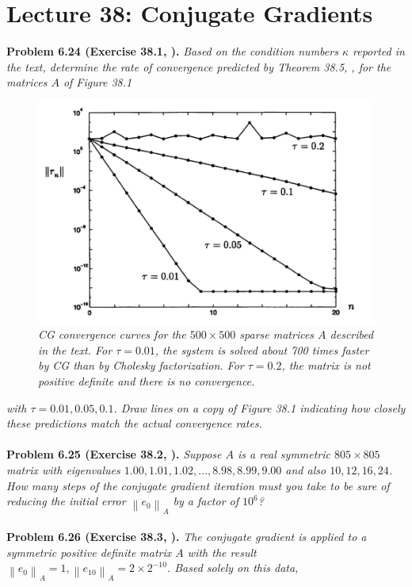 \documentclass[a4paper,oneside]{book}
\numberwithin{equation}{chapter}
\begin{document}
\section{Lecture 38: Conjugate Gradients}
\textbf{Problem 6.24 (Exercise 38.1, \cite{1}).} \textit{Based on the condition numbers $\kappa$ reported in the text, determine the rate of convergence predicted by Theorem 38.5, \cite{1}, for the matrices $A$ of Figure 38.1}
\begin{figure}[H]
	\centering
	\includegraphics[scale=0.35]{14}
	\caption{\textit{CG convergence curves for the $500\times 500$ sparse matrices $A$ described in the text. For $\tau =0.01$, the system is solved about 700 times faster by CG than by Cholesky factorization. For $\tau = 0.2$, the matrix is not positive definite and there is no convergence.}}
\end{figure}
\textit{with $\tau =0.01,0.05,0.1$. Draw lines on a copy of Figure 38.1 indicating how closely these predictions match the actual convergence rates.}\\
\\
\textbf{Problem 6.25 (Exercise 38.2, \cite{1}).} \textit{Suppose $A$ is a real symmetric $805\times 805$ matrix with eigenvalues $1.00,1.01,1.02,\ldots,8.98,8.99,9.00$ and also $10,12,16,24$. How many steps of the conjugate gradient iteration must you take to be sure of reducing the initial error $\left\|e_0\right\|_A$ by a factor of $10^6$?}\\
\\
\textbf{Problem 6.26 (Exercise 38.3, \cite{1}).} \textit{The conjugate gradient is applied to a symmetric positive definite matrix $A$ with the result ${\left\| {{e_0}} \right\|_A} = 1,{\left\| {{e_{10}}} \right\|_A} = 2 \times {2^{ - 10}}$. Based solely on this data,}
\end{document}
